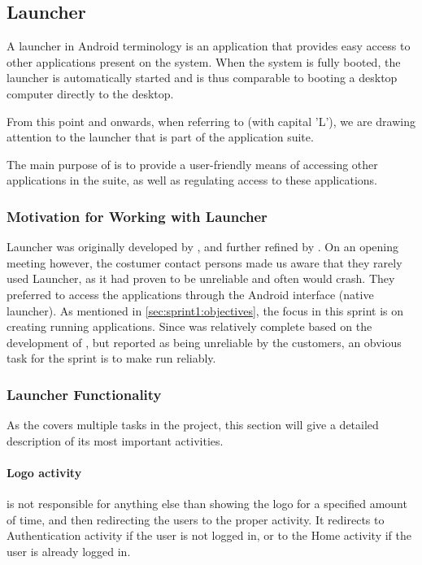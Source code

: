 \subsection{Launcher}\label{sec:launcher}
A launcher in Android terminology is an application that provides easy access to other applications present on the system.
When the system is fully booted, the launcher is automatically started and is thus comparable to booting a desktop computer directly to the desktop.

From this point and onwards, when referring to \textit{\launcher} (with capital 'L'), we are drawing attention to the launcher that is part of the \giraf application suite.

The main purpose of \launcher is to provide a user-friendly means of accessing other applications in the \giraf suite, as well as regulating access to these applications.

\subsubsection{Motivation for Working with Launcher}
Launcher was originally developed by \citet{launcher2011}, and further refined by \citet{launcher2012}.
On an opening meeting however, the costumer contact persons made us aware that they rarely used Launcher, as it had proven to be unreliable and often would crash. 
They preferred to access the \giraf applications through the Android interface (native launcher).
As mentioned in \cref{sec:sprint1:objectives}, the focus in this sprint is on creating running applications.
Since \launcher was relatively complete based on the development of \citet{launcher2012}, but reported as being unreliable by the customers, an obvious task for the sprint is to make \launcher run reliably.

\subsubsection{Launcher Functionality}
As the \launcher covers multiple tasks in the \giraf project, this section will give a detailed description of its most important activities.

\paragraph{Logo activity} is not responsible for anything else than showing the \giraf logo for a specified amount of time, and then redirecting the users to the proper activity.
It redirects to Authentication activity if the user is not logged in, or to the Home activity if the user is already logged in.

